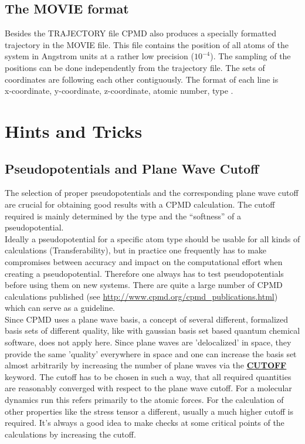 \documentclass[twoside,10pt,titlepage,a4paper]{article}
\newcommand{\referto}[2]{\hyperlink{#1}{#2}}
\newcommand{\referto}[2]{\htmlref{#2}{#1}}
\newcommand{\htref}[2]{\href{#1}{#2}}
\newcommand{\htref}[2]{\htmladdnormallink{#2}{#1}}
\newcommand{\refkeyword}[1]{%
\referto{#1}{\textbf{#1}}%
\index{#1}%
}%
\begin{document}
\subsection{The MOVIE format}

Besides the TRAJECTORY file CPMD also produces a specially
formatted trajectory in the MOVIE file. This file contains the position
of all atoms of the system in Angstrom units at a rather low
precision ($10^{-4}$). The sampling of the positions can be done
independently from the trajectory file. The sets of coordinates are
following each other contiguously. The format of each line is \\[10pt]
x-coordinate, y-coordinate, z-coordinate, atomic number, type .


\clearpage
\section{Hints and Tricks}\label{hints}

\subsection{Pseudopotentials and Plane Wave Cutoff}\label{hints:cutoff}
The selection of proper pseudopotentials and the corresponding
plane wave cutoff are crucial for obtaining good results with
a CPMD calculation. The cutoff required is mainly determined by
the type and the ``softness'' of a pseudopotential.\\
Ideally a pseudopotential for a specific atom type should be
usable for all kinds of calculations (Transferability), but in
practice one frequently has to make compromises between accuracy
and impact on the computational effort when creating a pseudopotential.
Therefore one always has to test pseudopotentials before using them
on new systems. There are quite a large number of CPMD calculations
published (see
\htref{http://www.cpmd.org/cpmd_publications.html}{http://www.cpmd.org/cpmd\_publications.html})
which can serve as a guideline.\\

Since CPMD uses a plane wave basis, a concept of several different,
formalized basis sets of different quality, like with gaussian basis set
based quantum chemical software, does not apply here.
Since plane waves are 'delocalized' in space, they provide the same
'quality' everywhere in space and one can increase the basis set almost
arbitrarily by increasing the number of plane waves via the
\refkeyword{CUTOFF} keyword.  The cutoff has to be chosen
in such a way, that all required quantities are reasonably converged
with respect to the plane wave cutoff. For a molecular dynamics
run this refers primarily to the atomic forces. For the calculation
of other properties like the stress tensor a different, usually a much
higher cutoff is required. It's always a good idea to make checks at
some critical points of the calculations by increasing the cutoff.\\
\end{document}
